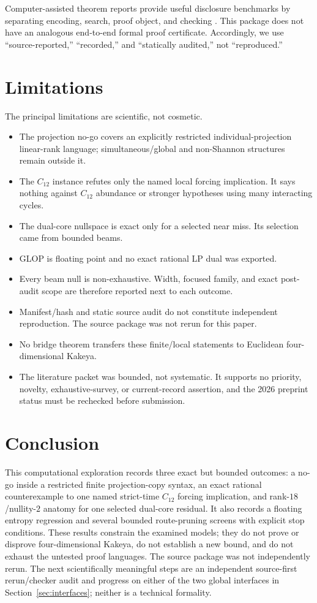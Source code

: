 \documentclass[11pt]{article}
\begin{document}
Computer-assisted theorem reports provide useful disclosure benchmarks by separating encoding, search, proof object, and checking \citep{HeuleKullmannMarek2016Pythagorean,Heule2018SchurFive}. This package does not have an analogous end-to-end formal proof certificate. Accordingly, we use ``source-reported,'' ``recorded,'' and ``statically audited,'' not ``reproduced.''

\section{Limitations}

The principal limitations are scientific, not cosmetic.
\begin{itemize}
  \item The projection no-go covers an explicitly restricted individual-projection linear-rank language; simultaneous/global and non-Shannon structures remain outside it.
  \item The $C_{12}$ instance refutes only the named local forcing implication. It says nothing against $C_{12}$ abundance or stronger hypotheses using many interacting cycles.
  \item The dual-core nullspace is exact only for a selected near miss. Its selection came from bounded beams.
  \item GLOP is floating point and no exact rational LP dual was exported.
  \item Every beam null is non-exhaustive. Width, focused family, and exact post-audit scope are therefore reported next to each outcome.
  \item Manifest/hash and static source audit do not constitute independent reproduction. The source package was not rerun for this paper.
  \item No bridge theorem transfers these finite/local statements to Euclidean four-dimensional Kakeya.
  \item The literature packet was bounded, not systematic. It supports no priority, novelty, exhaustive-survey, or current-record assertion, and the 2026 preprint status must be rechecked before submission.
\end{itemize}

\section{Conclusion}

This computational exploration records three exact but bounded outcomes: a no-go inside a restricted finite projection-copy syntax, an exact rational counterexample to one named strict-time $C_{12}$ forcing implication, and rank-$18$/nullity-$2$ anatomy for one selected dual-core residual. It also records a floating entropy regression and several bounded route-pruning screens with explicit stop conditions. These results constrain the examined models; they do not prove or disprove four-dimensional Kakeya, do not establish a new bound, and do not exhaust the untested proof languages. The source package was not independently rerun. The next scientifically meaningful steps are an independent source-first rerun/checker audit and progress on either of the two global interfaces in Section~\ref{sec:interfaces}; neither is a technical formality.
\end{document}
